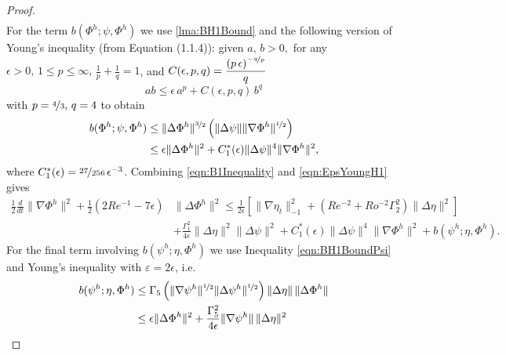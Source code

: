 \begin{proof}
\begin{equation}
\begin{split}
    \end{split}
    \label{eqn:B1Inequality}
  \end{equation}
  For the term $b(\Phi^h; \psi, \Phi^h)$ we use \autoref{lma:BH1Bound} and the
  following version of Young's inequality (from \cite{Layton08} Equation (1.1.4)):
  given $a,\,b>0,$ for any $\epsilon > 0,\, 1\le p \le \infty,\, \frac{1}{p} +
  \frac{1}{q} = 1$, and
  $C(\epsilon,p,q)=\dfrac{\left(p\,\epsilon\right)^{-\nicefrac{q}{p}}}{q}$
  \begin{equation*}
    ab \le \epsilon\, a^p + C(\epsilon,p,q)\, b^q
  \end{equation*}
  with $p=\nicefrac{4}{3},\, q = 4$ to obtain
  \begin{align}
    b(\Phi^h; \psi, \Phi^h) &\le \|\Delta \Phi^h\|^{\nicefrac{3}{2}}
      \left(\|\Delta \psi\| \|\nabla \Phi^h\|^{\nicefrac{1}{2}}\right)
      \nonumber \\
    &\le \epsilon \|\Delta \Phi^h\|^2 + C^*_1(\epsilon) \|\Delta \psi\|^4
      \|\nabla \Phi^h\|^2,
    \label{eqn:EpsYoungH1}
  \end{align}
  where $C^*_1(\epsilon) = \nicefrac{27}{256}\,\epsilon^{-3}$.
  Combining \eqref{eqn:B1Inequality} and \eqref{eqn:EpsYoungH1} gives
  \begin{equation}
    \begin{split}
      \frac{1}{2} \frac{d}{dt} \|\nabla \Phi^h\|^2 + \frac{1}{2}\left(2Re^{-1} -
        7 \epsilon \right)
        &\|\Delta \Phi^h\|^2 \le \frac{1}{2 \epsilon}\left[\|\nabla \eta_t\|_{-1}^2
        + \left( Re^{-2} + Ro^{-2} \Gamma_2^2 \right) \|\Delta \eta\|^2\right] \\
      & + \frac{\Gamma_1^2}{4\epsilon}\|\Delta \eta\|^2 \|\Delta \psi\|^2
        + C^*_1(\epsilon) \|\Delta \psi\|^4 \|\nabla \Phi^h\|^2
        + b(\psi^h;\eta,\Phi^h).
    \end{split}
    \label{eqn:B2Inequality}
  \end{equation}
  For the final term involving $b(\psi^h; \eta, \Phi^h)$ we use
  Inequality \eqref{eqn:BH1BoundPsi} and Young's inequality with $\varepsilon =
  2 \epsilon$, i.e.
  \begin{align}
    b(\psi^h; \eta, \Phi^h) &\le \Gamma_5\left(\|\nabla \psi^h\|^{\nicefrac{1}{2}}
      \|\Delta \psi^h\|^{\nicefrac{1}{2}}\right) \|\Delta \eta\|\,
      \|\Delta \Phi^h\| \nonumber \\
    &\le \epsilon \|\Delta \Phi^h\|^2 + \frac{\Gamma_5^2}{4\epsilon}
      \|\nabla \psi^h\|\, \|\Delta \eta\|^2 \label{eqn:YoungPhih}
  \end{align}

\end{proof}
